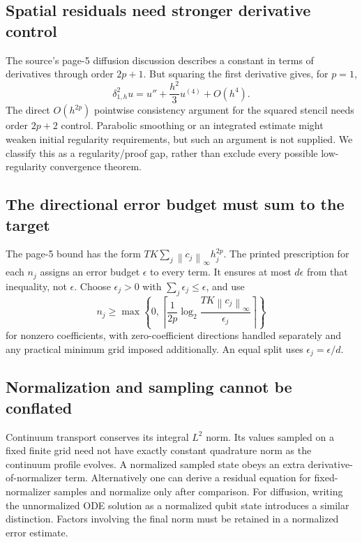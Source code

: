 \documentclass[11pt]{article}
\newcommand{\norm}[1]{\left\lVert #1\right\rVert}
\begin{document}
\subsection{Spatial residuals need stronger derivative control}
The source's page-5 diffusion discussion describes a constant in terms
of derivatives through order $2p+1$. But squaring the first derivative
gives, for $p=1$,
\[
 \delta_{1,h}^2u=u''+\frac{h^2}{3}u^{(4)}+O(h^4).
\]
The direct $O(h^{2p})$ pointwise consistency argument for the squared
stencil needs order $2p+2$ control. Parabolic smoothing or an integrated
estimate might weaken initial regularity requirements, but such an
argument is not supplied. We classify this as a regularity/proof gap,
rather than exclude every possible low-regularity convergence theorem.

\subsection{The directional error budget must sum to the target}
The page-5 bound has the form
$TK\sum_j\norm{c_j}_\infty h_j^{2p}$.
The printed prescription for each $n_j$ assigns an error budget
$\epsilon$ to every term. It ensures at most $d\epsilon$ from that
inequality, not $\epsilon$. Choose $\epsilon_j>0$ with
$\sum_j\epsilon_j\leq\epsilon$, and use
\[
 n_j\geq
 \max\!\left\{0,\left\lceil\frac1{2p}
 \log_2\frac{TK\norm{c_j}_\infty}{\epsilon_j}\right\rceil\right\}
\]
for nonzero coefficients, with zero-coefficient directions handled
separately and any practical minimum grid imposed additionally.
An equal split uses $\epsilon_j=\epsilon/d$.

\subsection{Normalization and sampling cannot be conflated}
Continuum transport conserves its integral $L^2$ norm. Its values sampled
on a fixed finite grid need not have exactly constant quadrature norm
as the continuum profile evolves. A normalized sampled state obeys an
extra derivative-of-normalizer term. Alternatively one can derive a
residual equation for fixed-normalizer samples and normalize only after
comparison. For diffusion, writing the unnormalized ODE solution as a
normalized qubit state introduces a similar distinction. Factors involving
the final norm must be retained in a normalized error estimate.
\end{document}

